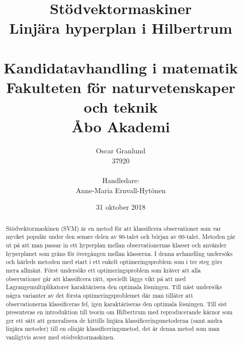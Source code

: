 \documentclass[a4paper, 12pt]{report}
\title{{\Huge Stödvektormaskiner}\\
{\Large Linjära hyperplan i Hilbertrum}\\
~\\
{\large Kandidatavhandling i matematik}\\
{\large Fakulteten för naturvetenskaper och teknik}\\
{\large Åbo Akademi}}
\author{{\Large Oscar Granlund}\\
{\Large37920}\\
\\
{\large Handledare:}\\{\large Anne-Maria Ernvall-Hytönen}}
\date{31 oktober 2018}
\theoremstyle{definition}
\theoremstyle{remark}
\newcommand{\bfx}{\mathbf{x}}
\newcommand{\bfy}{\mathbf{y}}
\begin{document}
\maketitle

\begin{abstract}
	Stödvektormaskinen (SVM) är en metod för att klassificera observationer som var mycket populär under den senare delen av 90-talet och början av 00-talet.
	Metoden går ut på att man passar in ett hyperplan mellan observationernas klasser och använder hyperplanet som gräns för övergången mellan klasserna.
	I denna avhandling undersöks och härleds metoden med start i ett enkelt optimeringsproblem som i tre steg görs mera allmänt.
	Först undersöks ett optimeringsproblem som kräver att alla observationer går att klassificera rätt, speciellt läggs vikt på att med Lagrangemultiplikatorer karaktärisera den optimala lösningen.
	Till näst undersöks några varianter av det första optimeringsproblemet där man tillåter att observationerna klassificeras fel, igen karaktäriseras den optimala lösningen.
	Till sist presenteras en introduktion till teorin om Hilbertrum med reproducerande kärnor som ger ett sätt att generalisera de hittills linjära klassificeringsmetoderna (samt andra linjära metoder) till en olinjär klassificeringsmetod, det är denna metod som man vanligtvis avser med stödvektormaskinen.
\end{abstract}

\tableofcontents
\end{document}
